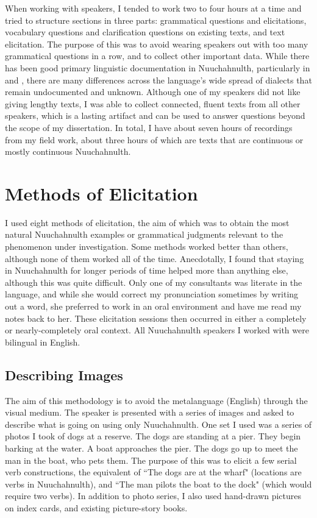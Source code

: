 When working with speakers, I tended to work two to four hours at a time and tried to structure sections in three parts: grammatical questions and elicitations, vocabulary questions and clarification questions on existing texts, and text elicitation. The purpose of this was to avoid wearing speakers out with too many grammatical questions in a row, and to collect other important data. While there has been good primary linguistic documentation in Nuuchahnulth, particularly in \cite{sapir1939} and \cite{rose1981}, there are many differences across the language's wide spread of dialects that remain undocumented and unknown. Although one of my speakers did not like giving lengthy texts, I was able to collect connected, fluent texts from all other speakers, which is a lasting artifact and can be used to answer questions beyond the scope of my dissertation. In total, I have about seven hours of recordings from my field work, about three hours of which are texts that are continuous or mostly continuous Nuuchahnulth.


\section{Methods of Elicitation}

I used eight methods of elicitation, the aim of which was to obtain the most natural Nuuchahnulth examples or grammatical judgments relevant to the phenomenon under investigation. Some methods worked better than others, although none of them worked all of the time. Anecdotally, I found that staying in Nuuchahnulth for longer periods of time helped more than anything else, although this was quite difficult. Only one of my consultants was literate in the language, and while she would correct my pronunciation sometimes by writing out a word, she preferred to work in an oral environment and have me read my notes back to her. These elicitation sessions then occurred in either a completely or nearly-completely oral context. All Nuuchahnulth speakers I worked with were bilingual in English.

\subsection{Describing Images}

The aim of this methodology is to avoid the metalanguage (English) through the visual medium. The speaker is presented with a series of images and asked to describe what is going on using only Nuuchahnulth. One set I used was a series of photos I took of dogs at a reserve. The dogs are standing at a pier. They begin barking at the water. A boat approaches the pier. The dogs go up to meet the man in the boat, who pets them. The purpose of this was to elicit a few serial verb constructions, the equivalent of ``The dogs are at the wharf" (locations are verbs in Nuuchahnulth), and ``The man pilots the boat to the dock" (which would require two verbs). In addition to photo series, I also used hand-drawn pictures on index cards, and existing picture-story books.

